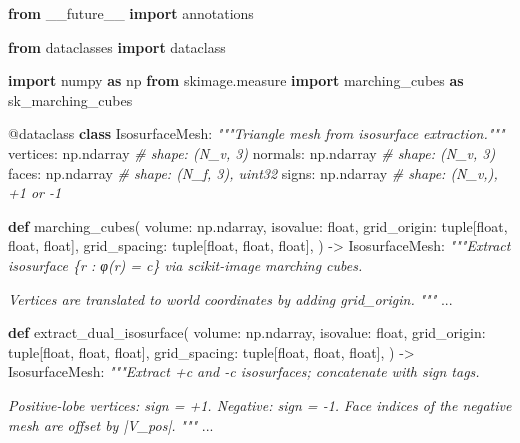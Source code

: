 \documentclass[
  11pt,
]{report}
\newenvironment{Shaded}{}{}
\newcommand{\AttributeTok}[1]{\textcolor[rgb]{0.49,0.56,0.16}{#1}}
\newcommand{\BuiltInTok}[1]{\textcolor[rgb]{0.00,0.50,0.00}{#1}}
\newcommand{\CommentTok}[1]{\textcolor[rgb]{0.38,0.63,0.69}{\textit{#1}}}
\newcommand{\ImportTok}[1]{\textcolor[rgb]{0.00,0.50,0.00}{\textbf{#1}}}
\newcommand{\KeywordTok}[1]{\textcolor[rgb]{0.00,0.44,0.13}{\textbf{#1}}}
\newcommand{\NormalTok}[1]{#1}
\newcommand{\OperatorTok}[1]{\textcolor[rgb]{0.40,0.40,0.40}{#1}}
\begin{document}
\begin{Shaded}
\begin{Highlighting}[]
\ImportTok{from}\NormalTok{ \_\_future\_\_ }\ImportTok{import}\NormalTok{ annotations}

\ImportTok{from}\NormalTok{ dataclasses }\ImportTok{import}\NormalTok{ dataclass}

\ImportTok{import}\NormalTok{ numpy }\ImportTok{as}\NormalTok{ np}
\ImportTok{from}\NormalTok{ skimage.measure }\ImportTok{import}\NormalTok{ marching\_cubes }\ImportTok{as}\NormalTok{ sk\_marching\_cubes}


\AttributeTok{@dataclass}
\KeywordTok{class}\NormalTok{ IsosurfaceMesh:}
    \CommentTok{"""Triangle mesh from isosurface extraction."""}
\NormalTok{    vertices: np.ndarray    }\CommentTok{\# shape: (N\_v, 3)}
\NormalTok{    normals: np.ndarray     }\CommentTok{\# shape: (N\_v, 3)}
\NormalTok{    faces: np.ndarray       }\CommentTok{\# shape: (N\_f, 3), uint32}
\NormalTok{    signs: np.ndarray       }\CommentTok{\# shape: (N\_v,), +1 or {-}1}


\KeywordTok{def}\NormalTok{ marching\_cubes(}
\NormalTok{    volume: np.ndarray,}
\NormalTok{    isovalue: }\BuiltInTok{float}\NormalTok{,}
\NormalTok{    grid\_origin: }\BuiltInTok{tuple}\NormalTok{[}\BuiltInTok{float}\NormalTok{, }\BuiltInTok{float}\NormalTok{, }\BuiltInTok{float}\NormalTok{],}
\NormalTok{    grid\_spacing: }\BuiltInTok{tuple}\NormalTok{[}\BuiltInTok{float}\NormalTok{, }\BuiltInTok{float}\NormalTok{, }\BuiltInTok{float}\NormalTok{],}
\NormalTok{) }\OperatorTok{{-}\textgreater{}}\NormalTok{ IsosurfaceMesh:}
    \CommentTok{"""Extract isosurface \{r : φ(r) = c\} via scikit{-}image marching cubes.}

\CommentTok{    Vertices are translated to world coordinates by adding grid\_origin.}
\CommentTok{    """}
\NormalTok{    ...}


\KeywordTok{def}\NormalTok{ extract\_dual\_isosurface(}
\NormalTok{    volume: np.ndarray,}
\NormalTok{    isovalue: }\BuiltInTok{float}\NormalTok{,}
\NormalTok{    grid\_origin: }\BuiltInTok{tuple}\NormalTok{[}\BuiltInTok{float}\NormalTok{, }\BuiltInTok{float}\NormalTok{, }\BuiltInTok{float}\NormalTok{],}
\NormalTok{    grid\_spacing: }\BuiltInTok{tuple}\NormalTok{[}\BuiltInTok{float}\NormalTok{, }\BuiltInTok{float}\NormalTok{, }\BuiltInTok{float}\NormalTok{],}
\NormalTok{) }\OperatorTok{{-}\textgreater{}}\NormalTok{ IsosurfaceMesh:}
    \CommentTok{"""Extract +c and {-}c isosurfaces; concatenate with sign tags.}

\CommentTok{    Positive{-}lobe vertices: sign = +1. Negative: sign = {-}1.}
\CommentTok{    Face indices of the negative mesh are offset by |V\_pos|.}
\CommentTok{    """}
\NormalTok{    ...}
\end{Highlighting}
\end{Shaded}
\end{document}
